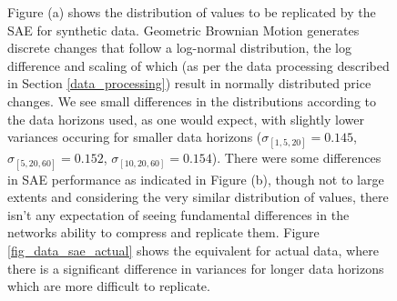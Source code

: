 \documentclass[a4paper,11pt,oneside]{article}
\theoremstyle{plain}
\theoremstyle{definition}
\begin{document}
\begin{figure}[H]
{			\newline Figure (a) shows the distribution of values to be replicated by the SAE for synthetic data. Geometric Brownian Motion generates discrete changes that follow a log-normal distribution, the log difference and scaling of which (as per the data processing described in Section \ref{data_processing}) result in normally distributed price changes. We see small differences in the distributions according to the data horizons used, as one would expect, with slightly lower variances occuring for smaller data horizons ($\sigma_{[1,5,20]} = 0.145$, $\sigma_{[5,20,60]} = 0.152$, $\sigma_{[10,20,60]} = 0.154$). There were some differences in SAE performance as indicated in Figure (b), though not to large extents and considering the very similar distribution of values, there isn't any expectation of seeing fundamental differences in the networks ability to compress and replicate them. 
			\newline Figure \ref{fig_data_sae_actual} shows the equivalent for actual data, where there is a significant difference in variances for longer data horizons which are more difficult to replicate.}
		\label{figure-data_sae_synthetic}
	\end{figure}
	
	
	
\end{document}
